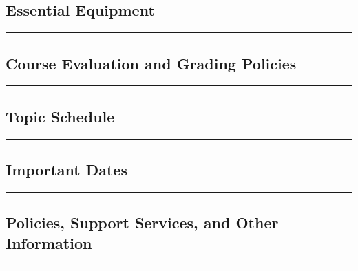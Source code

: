 \documentclass[11pt]{handout}
\begin{document}
 
  \subsection*{Essential Equipment}
  
  \vspace{2ex}\hrule\vspace{2ex}

   
  \subsection*{Course Evaluation and Grading Policies} 
  
  \vspace{2ex}\hrule\vspace{2ex}


\if{}
{
  \subsection*{Topic Schedule}
  
  \vspace{2ex}\hrule\vspace{2ex}
}
\fi


\if{}
{
  \subsection*{Important Dates}
  
  \vspace{2ex}\hrule\vspace{2ex}
}
\fi


\if{}
{
  \subsection*{Policies, Support Services, and Other Information}
  
  \vspace{2ex}\hrule\vspace{2ex}
}
\fi
 
\end{document}
